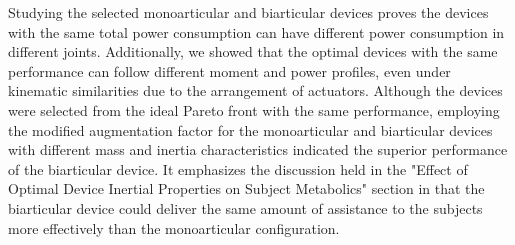 \documentclass[10pt,letterpaper]{article}
\begin{document}
Studying the selected monoarticular and biarticular devices proves the devices with the same total power consumption can have different power consumption in different joints. Additionally, we showed that the optimal devices with the same performance can follow different moment and power profiles, even under kinematic similarities due to the arrangement of actuators. Although the devices were selected from the ideal Pareto front with the same performance, employing the modified augmentation factor for the monoarticular and biarticular devices with different mass and inertia characteristics indicated the superior performance of the biarticular device. It emphasizes the discussion held in the "Effect of Optimal Device Inertial Properties on Subject Metabolics" section in that the biarticular device could deliver the same amount of assistance to the subjects more effectively than the monoarticular configuration.\\
\end{document}
